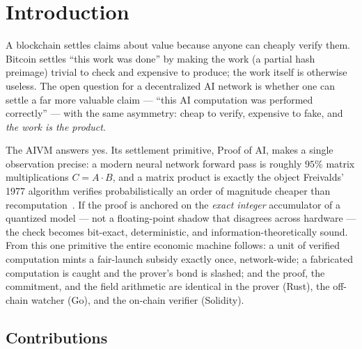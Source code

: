 \documentclass[11pt,a4paper]{article}
\begin{document}
\tableofcontents

\section{Introduction}

A blockchain settles claims about value because anyone can cheaply verify them. Bitcoin settles ``this work was done'' by making the work (a partial hash preimage) trivial to check and expensive to produce; the work itself is otherwise useless. The open question for a decentralized AI network is whether one can settle a far more valuable claim --- ``this AI computation was performed correctly'' --- with the same asymmetry: cheap to verify, expensive to fake, and \emph{the work is the product}.

The AIVM answers yes. Its settlement primitive, Proof of AI, makes a single observation precise: a modern neural network forward pass is roughly $95\%$ matrix multiplications $C = A \cdot B$, and a matrix product is exactly the object Freivalds' 1977 algorithm verifies probabilistically an order of magnitude cheaper than recomputation~\cite{freivalds}. If the proof is anchored on the \emph{exact integer} accumulator of a quantized model --- not a floating-point shadow that disagrees across hardware --- the check becomes bit-exact, deterministic, and information-theoretically sound. From this one primitive the entire economic machine follows: a unit of verified computation mints a fair-launch subsidy exactly once, network-wide; a fabricated computation is caught and the prover's bond is slashed; and the proof, the commitment, and the field arithmetic are identical in the prover (Rust), the off-chain watcher (Go), and the on-chain verifier (Solidity).

\subsection{Contributions}
\end{document}

